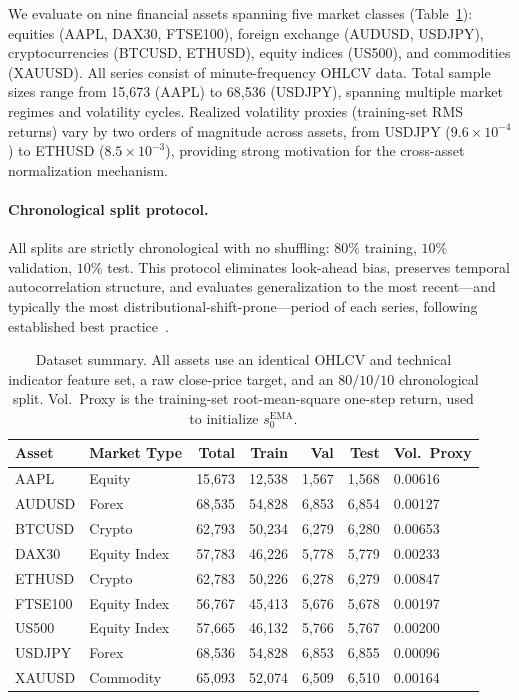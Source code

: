 \documentclass[11pt]{article}
\begin{document}
We evaluate on nine financial assets spanning five market classes
(Table~\ref{tab:data-summary}): equities (AAPL, DAX30, FTSE100),
foreign exchange (AUDUSD, USDJPY), cryptocurrencies (BTCUSD, ETHUSD),
equity indices (US500), and commodities (XAUUSD). All series consist
of minute-frequency OHLCV data. Total sample sizes range from
15{,}673 (AAPL) to 68{,}536 (USDJPY), spanning multiple market
regimes and volatility cycles. Realized volatility proxies
(training-set RMS returns) vary by two orders of magnitude across
assets, from USDJPY ($9.6 \times 10^{-4}$) to ETHUSD
($8.5 \times 10^{-3}$), providing strong motivation for the
cross-asset normalization mechanism.

\paragraph{Chronological split protocol.}
All splits are strictly chronological with no shuffling: $80\%$
training, $10\%$ validation, $10\%$ test. This protocol eliminates
look-ahead bias, preserves temporal autocorrelation structure, and
evaluates generalization to the most recent---and typically the most
distributional-shift-prone---period of each series, following
established best practice~\citep{makridakis2022m5,zeng2023dlinear,
welch2008comprehensive}.

\begin{table}[!htbp]
\centering
\caption{Dataset summary. All assets use an identical OHLCV and
  technical indicator feature set, a raw close-price target, and an
  $80/10/10$ chronological split. Vol.\ Proxy is the training-set
  root-mean-square one-step return, used to initialize
  $s_0^{\mathrm{EMA}}$.}
\label{tab:data-summary}
\small
\begin{tabularx}{\textwidth}{X l r r r r l}
\toprule
Asset   & Market Type    & Total     & Train      & Val       & Test      & Vol.\ Proxy \\
\midrule
AAPL    & Equity         & 15{,}673  & 12{,}538   & 1{,}567   & 1{,}568   & 0.00616 \\
AUDUSD  & Forex          & 68{,}535  & 54{,}828   & 6{,}853   & 6{,}854   & 0.00127 \\
BTCUSD  & Crypto         & 62{,}793  & 50{,}234   & 6{,}279   & 6{,}280   & 0.00653 \\
DAX30   & Equity Index   & 57{,}783  & 46{,}226   & 5{,}778   & 5{,}779   & 0.00233 \\
ETHUSD  & Crypto         & 62{,}783  & 50{,}226   & 6{,}278   & 6{,}279   & 0.00847 \\
FTSE100 & Equity Index   & 56{,}767  & 45{,}413   & 5{,}676   & 5{,}678   & 0.00197 \\
US500   & Equity Index   & 57{,}665  & 46{,}132   & 5{,}766   & 5{,}767   & 0.00200 \\
USDJPY  & Forex          & 68{,}536  & 54{,}828   & 6{,}853   & 6{,}855   & 0.00096 \\
XAUUSD  & Commodity      & 65{,}093  & 52{,}074   & 6{,}509   & 6{,}510   & 0.00164 \\
\bottomrule
\end{tabularx}
\end{table}
\end{document}
